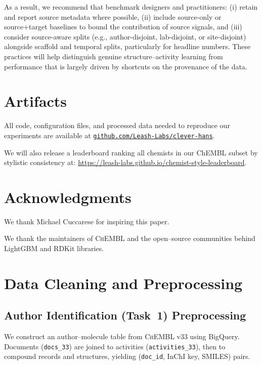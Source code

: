 \documentclass[11pt]{article}
\begin{document}
As a result, we recommend that benchmark designers and practitioners:
(i) retain and report source metadata where possible,
(ii) include source-only or source+target baselines to bound the contribution of source signals, and
(iii) consider source-aware splits (e.g., author-disjoint, lab-disjoint, or site-disjoint) alongside scaffold and temporal splits, particularly for headline numbers. These practices will help distinguish genuine structure--activity learning from performance that is largely driven by shortcuts on the provenance of the data.

\section{Artifacts}

All code, configuration files, and processed data needed to reproduce our experiments are available at
\href{https://github.com/Leash-Labs/clever-hans}{\texttt{github.com/Leash-Labs/clever-hans}}.

We will also release a leaderboard ranking all chemists in our ChEMBL subset by stylistic consistency at:
\url{https://leash-labs.github.io/chemist-style-leaderboard}.

\section*{Acknowledgments}
We thank Michael Cuccarese for inspiring this paper.

We thank the maintainers of \textsc{ChEMBL} and the open--source communities behind LightGBM and RDKit libraries.



\clearpage
\appendix

\section{Data Cleaning and Preprocessing}\label{app:cleaning}

\subsection{Author Identification (Task~1) Preprocessing}\label{app:task1-pre}

We construct an author--molecule table from \textsc{ChEMBL} v33 using BigQuery. Documents (\texttt{docs\_33}) are joined to activities (\texttt{activities\_33}), then to compound records and structures, yielding (\texttt{doc\_id}, InChI key, SMILES) pairs. 
\end{document}
